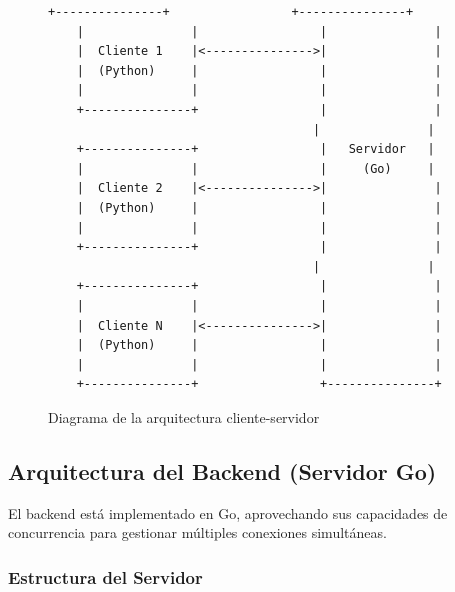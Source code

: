 \documentclass[11pt,letterpaper]{article}
\begin{document}
\begin{figure}[H]
    \centering
    \begin{lstlisting}[language=text]
    +---------------+                 +---------------+
    |               |                 |               |
    |  Cliente 1    |<--------------->|               |
    |  (Python)     |                 |               |
    |               |                 |               |
    +---------------+                 |               |
                                     |               |
    +---------------+                 |   Servidor   |
    |               |                 |     (Go)     |
    |  Cliente 2    |<--------------->|               |
    |  (Python)     |                 |               |
    |               |                 |               |
    +---------------+                 |               |
                                     |               |
    +---------------+                 |               |
    |               |                 |               |
    |  Cliente N    |<--------------->|               |
    |  (Python)     |                 |               |
    |               |                 |               |
    +---------------+                 +---------------+
    \end{lstlisting}
    \caption{Diagrama de la arquitectura cliente-servidor}
\end{figure}

\subsection{Arquitectura del Backend (Servidor Go)}

El backend está implementado en Go, aprovechando sus capacidades de concurrencia para gestionar múltiples conexiones simultáneas.

\subsubsection{Estructura del Servidor}
\end{document}
